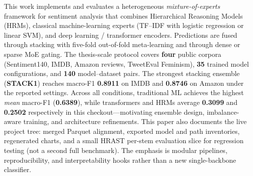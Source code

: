 This work implements and evaluates a heterogeneous \emph{mixture-of-experts} framework for sentiment analysis that combines Hierarchical Reasoning Models (HRMs), classical machine-learning experts (TF--IDF with logistic regression or linear SVM), and deep learning / transformer encoders. Predictions are fused through stacking with five-fold out-of-fold meta-learning and through dense or sparse MoE gating. The thesis-scale protocol covers \textbf{four} public corpora (Sentiment140, IMDB, Amazon reviews, TweetEval Feminism), \textbf{35} trained model configurations, and \textbf{140} model--dataset pairs. The strongest stacking ensemble (\textbf{STACK1}) reaches macro-F1 \textbf{0.8911} on IMDB and \textbf{0.8746} on Amazon under the reported settings. Across all conditions, traditional ML achieves the highest \emph{mean} macro-F1 (\textbf{0.6389}), while transformers and HRMs average \textbf{0.3099} and \textbf{0.2502} respectively in this checkout---motivating ensemble design, imbalance-aware training, and architecture refinements. This paper also documents the live project tree: merged Parquet alignment, exported model and path inventories, regenerated charts, and a small HRAST per-stem evaluation slice for regression testing (not a second full benchmark). The emphasis is modular pipelines, reproducibility, and interpretability hooks rather than a new single-backbone classifier.
